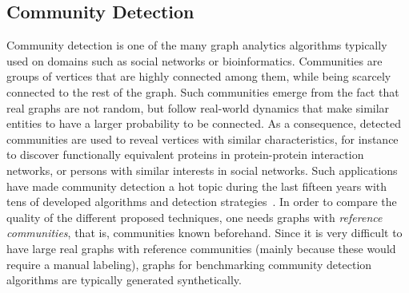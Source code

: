 \subsection{Community Detection}
\label{sec:generators_community_detection}

Community detection is one of the many graph analytics algorithms typically used on domains such as social networks or bioinformatics. Communities are groups of vertices that are highly connected among them, while being scarcely connected to the rest of the graph. Such communities emerge from the fact that real graphs are not random, but follow real-world dynamics that make similar entities to have a larger probability to be connected. As a consequence, detected communities are used to reveal vertices with similar characteristics, for instance to discover functionally equivalent proteins in protein-protein interaction networks, or persons with similar interests in social networks. Such applications have made community detection a hot topic during the last fifteen years with tens of developed algorithms and detection strategies~\cite{doi:10.1002/wics.1403,Kim:2015:CDM:2854006.2854013}. In order to compare the quality of the different proposed techniques, one needs graphs with \emph{reference communities}, that is, communities known beforehand. Since it is very difficult to have large real graphs with reference communities (mainly because these would require a manual labeling), graphs for benchmarking community detection algorithms are typically generated synthetically.

